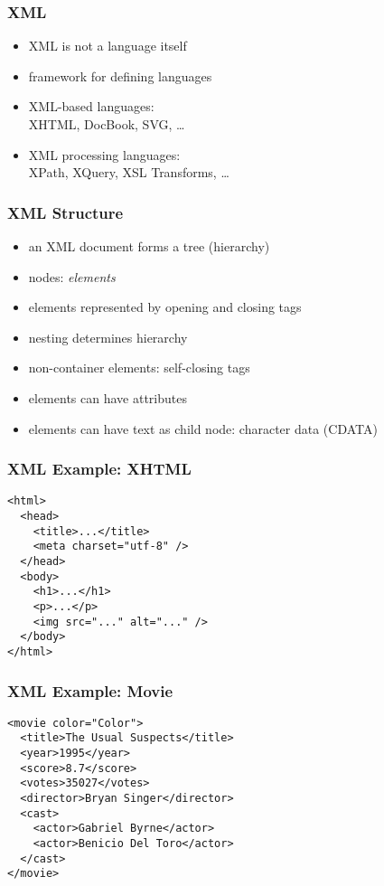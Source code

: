 \documentclass[dvipsnames]{beamer}
\theoremstyle{plain}
\begin{document}
\lstset{language=XML}

\begin{frame}
  \frametitle{XML}

  \begin{itemize}
    \item XML is not a language itself
    \item framework for defining languages

    \medskip
    \item XML-based languages:\\
      XHTML, DocBook, SVG, \ldots

    \smallskip
    \item XML processing languages:\\
      XPath, XQuery, XSL Transforms, \ldots
  \end{itemize}
\end{frame}

\begin{frame}
  \frametitle{XML Structure}

  \begin{itemize}
    \item an XML document forms a tree (hierarchy)

    \medskip
    \item nodes: \emph{elements}
    \item elements represented by opening and closing tags
    \item nesting determines hierarchy
    \item non-container elements: self-closing tags

    \medskip
    \item elements can have attributes
    \item elements can have text as child node: character data (CDATA)
  \end{itemize}
\end{frame}

\begin{frame}[fragile]
  \frametitle{XML Example: XHTML}

  \begin{lstlisting}
<html>
  <head>
    <title>...</title>
    <meta charset="utf-8" />
  </head>
  <body>
    <h1>...</h1>
    <p>...</p>
    <img src="..." alt="..." />
  </body>
</html>
  \end{lstlisting}
\end{frame}

\begin{frame}[fragile]
  \frametitle{XML Example: Movie}

  \begin{lstlisting}
<movie color="Color">
  <title>The Usual Suspects</title>
  <year>1995</year>
  <score>8.7</score>
  <votes>35027</votes>
  <director>Bryan Singer</director>
  <cast>
    <actor>Gabriel Byrne</actor>
    <actor>Benicio Del Toro</actor>
  </cast>
</movie>
  \end{lstlisting}
\end{frame}
\end{document}
